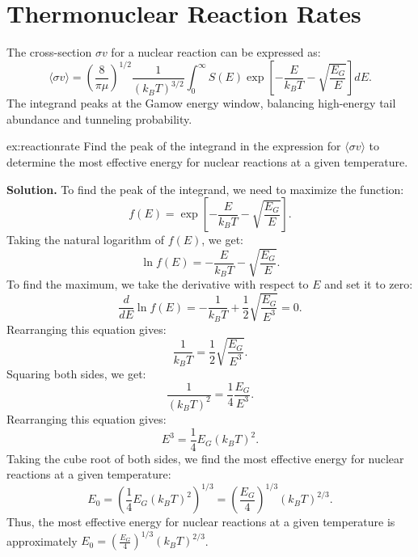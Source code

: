 \section{Thermonuclear Reaction Rates}

\begin{theory}
The cross-section $\sigma v$ for a nuclear reaction can be expressed as:
\begin{equation}
    \langle\sigma v\rangle = \left(\frac{8}{\pi\mu}\right)^{1/2}
    \frac{1}{(k_BT)^{3/2}}\int_0^\infty S(E)
    \exp\left[-\frac{E}{k_BT}-\sqrt{\frac{E_G}{E}}\right]dE.
\end{equation}
The integrand peaks at the Gamow energy window, balancing high-energy tail abundance and tunneling probability.
\end{theory}

\begin{example}{}{ex:reactionrate}
Find the peak of the integrand in the expression for $\langle\sigma v\rangle$ to determine the most effective energy for nuclear reactions at a given temperature.

\smallskip\textbf{Solution.}
To find the peak of the integrand, we need to maximize the function:
\begin{equation}
f(E) = \exp\left[-\frac{E}{k_BT}-\sqrt{\frac{E_G}{E}}\right].
\end{equation}
Taking the natural logarithm of $f(E)$, we get:
\begin{equation}
\ln f(E) = -\frac{E}{k_BT} - \sqrt{\frac{E_G}{E}}.
\end{equation}  
To find the maximum, we take the derivative with respect to $E$ and set it to zero:
\begin{equation}
\frac{d}{dE} \ln f(E) = -\frac{1}{k_BT} + \frac{1}{2} \sqrt{\frac{E_G}{E^3}} = 0.
\end{equation}
Rearranging this equation gives:
\begin{equation}
\frac{1}{k_BT} = \frac{1}{2} \sqrt{\frac{E_G}{E^3}}.
\end{equation}
Squaring both sides, we get:
\begin{equation}
\frac{1}{(k_BT)^2} = \frac{1}{4} \frac{E_G}{E^3}.
\end{equation}
Rearranging this equation gives:
\begin{equation}
E^3 = \frac{1}{4} E_G (k_BT)^2.
\end{equation}  
Taking the cube root of both sides, we find the most effective energy for nuclear reactions at a given temperature:
\begin{equation}
E_0 = \left(\frac{1}{4} E_G (k_BT)^2\right)^{1/3} = \left(\frac{E_G}{4}\right)^{1/3} (k_BT)^{2/3}.
\end{equation}
Thus, the most effective energy for nuclear reactions at a given temperature is approximately $E_0 = \left(\frac{E_G}{4}\right)^{1/3} (k_BT)^{2/3}$.
\end{example}


